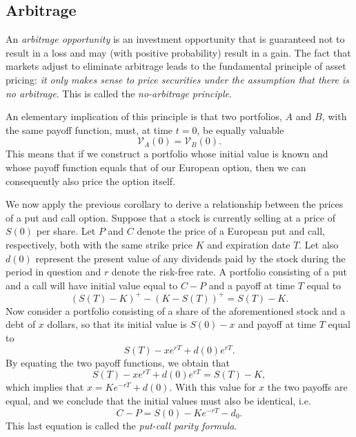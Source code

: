 \documentclass[]{article}
\theoremstyle{definition}
\theoremstyle{remark}
\begin{document}
\subsection{Arbitrage}
\par
An \textit{arbitrage opportunity} is an investment opportunity that is guaranteed not to result in a loss and may (with positive probability) result in a gain. The fact that markets adjust to eliminate arbitrage leads to the fundamental principle of asset pricing: \textit{it only makes sense to price securities under the assumption that there is no arbitrage}. This is called the \textit{no-arbitrage principle}.
\par 
An elementary implication of this principle is that two portfolios, $A$ and $B$, with the same payoff function, must, at time $t=0$, be equally valuable
\[\mathcal{V}_{A}(0) = \mathcal{V}_B (0). \]
This means that if we construct a portfolio whose initial value is known and whose payoff function equals that of our European option, then we can consequently also price the option itself.
\par We now apply the previous corollary to derive a relationship between the prices of a put and call option. Suppose that a stock is currently selling at a price of $S(0)$ per share. Let $P$ and $C$ denote the price of a European put and call, respectively, both with the same strike price $K$ and expiration date $T$. Let also $d(0)$ represent the present value of any dividends paid by the stock during the period in question and $r$ denote the risk-free rate. A portfolio consisting of a put and a call will have initial value equal to $C-P$ and a payoff at time $T$ equal to
\[(S(T) - K)^+ -(K-S(T))^+ = S(T)-K.\]
Now consider a portfolio consisting of a share of the aforementioned stock and a debt of $x$ dollars, so that its initial value is $S(0)-x$ and payoff at time $T$ equal to
\[  S(T) - x e^{rT} +d(0) e^{r T}. \]
By equating the two payoff functions, we obtain that
\[
S(T) - x e^{rT} +d(0) e^{r T} = S(T) - K,
\]
which implies that $x=K e^{-rT} + d(0)$. With this value for $x$ the two payoffs are equal, and we conclude that the initial values must also be identical, i.e.
\[ C-P = S(0) - Ke^{-rT} - d_0. \]
This last equation is called the \textit{put-call parity formula}.
\newpage

 
\end{document}
